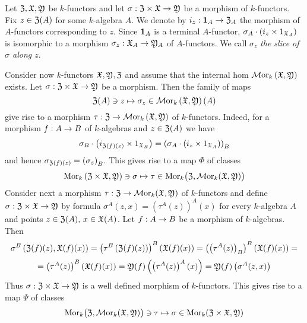 \begin{definition}
Let ${\mathfrak Z},{\mathfrak X},{\mathfrak Y}$ be $k$-functors and let $\sigma:{\mathfrak Z}\times {\mathfrak X}\rightarrow {\mathfrak Y}$ be a morphism of $k$-functors. Fix $z\in {\mathfrak Z}(A)$ for some $k$-algebra $A$. We denote by $i_z:\mathbf{1}_A\rightarrow {\mathfrak Z}_A$ the morphism of $A$-functors corresponding to $z$. Since $\mathbf{1}_A$ is a terminal $A$-functor, $\sigma_A\cdot \left(i_z\times 1_{{\mathfrak X}_A}\right)$ is isomorphic to a morphism $\sigma_z:{\mathfrak X}_A\rightarrow {\mathfrak Y}_A$ of $A$-functors. We call $\sigma_z$ \textit{the slice of $\sigma$ along $z$}.
\end{definition}
\noindent
Consider now $k$-functors ${\mathfrak X},{\mathfrak Y},{\mathfrak Z}$ and assume that the internal hom $\mathcal{M}\mathrm{or}_k\left({\mathfrak X},{\mathfrak Y}\right)$ exists. Let $\sigma:{\mathfrak Z}\times {\mathfrak X}\rightarrow {\mathfrak Y}$ be a morphism. Then the family of maps
$${\mathfrak Z}(A)\ni z\mapsto \sigma_z\in \mathcal{M}\mathrm{or}_k\left({\mathfrak X},{\mathfrak Y}\right)(A)$$
give rise to a morphism $\tau:{\mathfrak Z}\rightarrow \mathcal{M}\mathrm{or}_k\left({\mathfrak X},{\mathfrak Y}\right)$ of $k$-functors. Indeed, for a morphism $f:A\rightarrow B$ of $k$-algebras and $z\in {\mathfrak Z}(A)$ we have
$$\sigma_B\cdot \left(i_{{\mathfrak Z}(f)(z)}\times 1_{{\mathfrak X}_B}\right) = \left(\sigma_A\cdot \left(i_{z}\times 1_{{\mathfrak X}_A}\right)\right)_B$$
and hence $\sigma_{{\mathfrak Z}(f)(z)} = \left(\sigma_z\right)_B$. This gives rise to a map $\Phi$ of classes
$$\mathrm{Mor}_k\left({\mathfrak Z}\times {\mathfrak X},{\mathfrak Y}\right)\ni \sigma \mapsto \tau \in \mathrm{Mor}_k\big({\mathfrak Z},\mathcal{M}\mathrm{or}_k({\mathfrak X},{\mathfrak Y})\big)$$
Consider next a morphism $\tau:{\mathfrak Z}\rightarrow \mathcal{M}\mathrm{or}_k({\mathfrak X},{\mathfrak Y})$ of $k$-functors and define $\sigma:{\mathfrak Z}\times {\mathfrak X}\rightarrow {\mathfrak Y}$ by formula $\sigma^A(z,x) = \left(\tau^A(z)\right)^A(x)$ for every $k$-algebra $A$ and points $z\in {\mathfrak Z}(A),\,x\in {\mathfrak X}(A)$. Let $f:A\rightarrow B$ be a morphism of $k$-algebras. Then
$$\sigma^B\left({\mathfrak Z}(f)(z),{\mathfrak X}(f)(x)\right) = \left(\tau^B\left({\mathfrak Z}(f)(z)\right)\right)^B\left({\mathfrak X}(f)(x)\right) = \left(\left(\tau^A(z)\right)_B\right)^B\left({\mathfrak X}(f)(x)\right) =$$
$$ = \left(\tau^A(z)\right)^B\left({\mathfrak X}(f)(x)\right) = {\mathfrak Y}(f)\left(\left(\tau^A(z)\right)^A(x)\right) = {\mathfrak Y}(f)\left(\sigma^A(z,x)\right)$$
Thus $\sigma:{\mathfrak Z}\times {\mathfrak X}\rightarrow {\mathfrak Y}$ is a well defined morphism of $k$-functors. This gives rise to a map $\Psi$ of classes
$$\mathrm{Mor}_k\big({\mathfrak Z},\mathcal{M}\mathrm{or}_k({\mathfrak X},{\mathfrak Y})\big) \ni \tau \mapsto \sigma \in \mathrm{Mor}_k({\mathfrak Z}\times {\mathfrak X},{\mathfrak Y})$$

